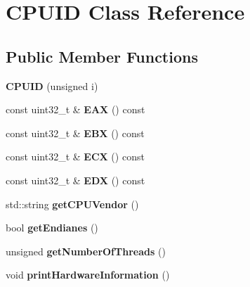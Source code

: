 \hypertarget{class_c_p_u_i_d}{}\section{C\+P\+U\+ID Class Reference}
\label{class_c_p_u_i_d}
\subsection*{Public Member Functions}
\begin{DoxyCompactItemize}
\item 
{\bfseries C\+P\+U\+ID} (unsigned i)\hypertarget{class_c_p_u_i_d_a18c6241f3f65fce5f97d0cf89e75f367}{}\label{class_c_p_u_i_d_a18c6241f3f65fce5f97d0cf89e75f367}

\item 
const uint32\+\_\+t \& {\bfseries E\+AX} () const \hypertarget{class_c_p_u_i_d_aa6601284e70a0916d9c469480966cbd7}{}\label{class_c_p_u_i_d_aa6601284e70a0916d9c469480966cbd7}

\item 
const uint32\+\_\+t \& {\bfseries E\+BX} () const \hypertarget{class_c_p_u_i_d_a00be36d9d083febb307c3ae6e38feac7}{}\label{class_c_p_u_i_d_a00be36d9d083febb307c3ae6e38feac7}

\item 
const uint32\+\_\+t \& {\bfseries E\+CX} () const \hypertarget{class_c_p_u_i_d_a33f163100a8f91ad81cbe56e2bd506d0}{}\label{class_c_p_u_i_d_a33f163100a8f91ad81cbe56e2bd506d0}

\item 
const uint32\+\_\+t \& {\bfseries E\+DX} () const \hypertarget{class_c_p_u_i_d_ab17d7f6f0a18ff5e5e8ecf1a22e25d89}{}\label{class_c_p_u_i_d_ab17d7f6f0a18ff5e5e8ecf1a22e25d89}

\item 
std\+::string {\bfseries get\+C\+P\+U\+Vendor} ()\hypertarget{class_c_p_u_i_d_ad9b9499f6e31a04536ee1242868faa17}{}\label{class_c_p_u_i_d_ad9b9499f6e31a04536ee1242868faa17}

\item 
bool {\bfseries get\+Endianes} ()\hypertarget{class_c_p_u_i_d_af31074460d6eae80a9920b58cbb19853}{}\label{class_c_p_u_i_d_af31074460d6eae80a9920b58cbb19853}

\item 
unsigned {\bfseries get\+Number\+Of\+Threads} ()\hypertarget{class_c_p_u_i_d_a4785c8f6b530e3b4b0fbe042dcc91140}{}\label{class_c_p_u_i_d_a4785c8f6b530e3b4b0fbe042dcc91140}

\item 
void {\bfseries print\+Hardware\+Information} ()\hypertarget{class_c_p_u_i_d_ab1fa95dd39b3e393ac82099fe6354c5c}{}\label{class_c_p_u_i_d_ab1fa95dd39b3e393ac82099fe6354c5c}

\end{DoxyCompactItemize}

